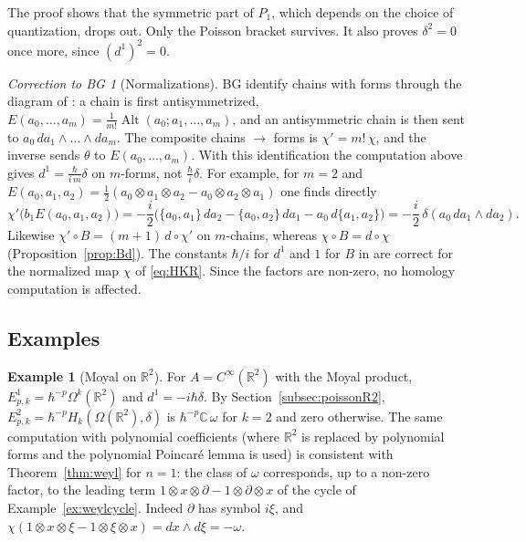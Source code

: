 \documentclass[11pt,oneside,reqno]{article}
\newcommand{\C}{\mathbb C}
\newcommand{\R}{\mathbb R}
\newcommand{\CI}{C^\infty}
\newcommand{\Om}{\Omega}
\newcommand{\hb}{\hbar}
\newcommand{\pa}{\partial}
\theoremstyle{plain}
\theoremstyle{definition}
\newtheorem{example}[theorem]{Example}
\theoremstyle{remark}
\newtheorem{correction}[theorem]{Correction to BG}
\begin{document}
The proof shows that the symmetric part of \(P_1\), which depends on the choice
of quantization, drops out. Only the Poisson bracket survives. It also proves
\(\delta^2=0\) once more, since \((d^1)^2=0\).

\begin{correction}[Normalizations]\label{corr:normalization}
BG identify chains with forms through the diagram of \cite[\S1]{BG}: a chain
is first antisymmetrized, \(E(a_0,\dots,a_m)=\frac1{m!}\operatorname{Alt}(a_0;a_1,\dots,a_m)\),
and an antisymmetric chain is then sent to \(a_0\,da_1\wedge\dots\wedge da_m\). The
composite chains \(\to\) forms is \(\chi'=m!\,\chi\), and the inverse sends
\(\theta\) to \(E(a_0,\dots,a_m)\). With this identification the computation above
gives \(d^1=\frac{\hb}{i\,m}\delta\) on \(m\)-forms, not \(\frac\hb i\delta\). For example, for
\(m=2\) and \(E(a_0,a_1,a_2)=\frac12(a_0\otimes a_1\otimes a_2-a_0\otimes a_2\otimes a_1)\) one finds
directly
\[
 \chi'\bigl(b_1E(a_0,a_1,a_2)\bigr)=-\frac i2\bigl(\{a_0,a_1\}\,da_2-\{a_0,a_2\}\,da_1-
 a_0\,d\{a_1,a_2\}\bigr)=-\frac i2\,\delta(a_0\,da_1\wedge da_2).
\]
Likewise \(\chi'\circ B=(m+1)\,d\circ\chi'\) on \(m\)-chains, whereas
\(\chi\circ B=d\circ\chi\) (Proposition~\ref{prop:Bd}). The constants \(\hb/i\) for
\(d^1\) and \(1\) for \(B\) in \cite[\S\S1,3]{BG} are correct for the normalized map
\(\chi\) of \eqref{eq:HKR}. Since the factors are non-zero, no homology
computation is affected.
\end{correction}

\subsection{Examples}\label{subsec:BG1examples}

\begin{example}[Moyal on \(\R^2\)]\label{ex:moyalE2}
For \(A=\CI(\R^2)\) with the Moyal product, \(E^1_{p,k}=\hb^{-p}\Om^k(\R^2)\) and
\(d^1=-i\hb\delta\). By Section~\ref{subsec:poissonR2},
\(E^2_{p,k}=\hb^{-p}H_k(\Om(\R^2),\delta)\) is \(\hb^{-p}\C\,\omega\) for \(k=2\) and zero
otherwise. The same computation with polynomial coefficients (where
\(\R^2\) is replaced by polynomial forms and the polynomial Poincaré lemma is
used) is consistent with Theorem~\ref{thm:weyl} for \(n=1\): the class of \(\omega\)
corresponds, up to a non-zero factor, to the leading term
\(1\otimes x\otimes\pa-1\otimes\pa\otimes x\) of the cycle of Example~\ref{ex:weylcycle}. Indeed
\(\pa\) has symbol \(i\xi\), and \(\chi(1\otimes x\otimes\xi-1\otimes\xi\otimes x)=dx\wedge d\xi=-\omega\).
\end{example}
\end{document}
